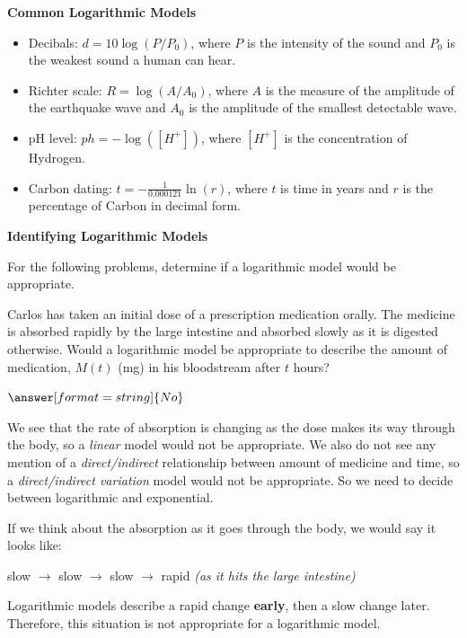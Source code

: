 \documentclass{ximera}
\begin{document}
\begin{center} \textbf{\Large Common Logarithmic Models} \end{center}

\begin{itemize}
	\item Decibals: $d = 10 \log(P/P_0)$, where $P$ is the intensity of the sound and $P_0$ is the weakest sound a human can hear.
	\item Richter scale: $R = \log(A/A_0)$, where $A$ is the measure of the amplitude of the earthquake wave and $A_0$ is the amplitude of the smallest detectable wave.
	\item pH level: $ph = -\log([H^+])$, where $[H^+]$ is the concentration of Hydrogen.
	\item Carbon dating: $t = -\frac{1}{0.000121} \ln(r)$, where $t$ is time in years and $r$ is the percentage of Carbon in decimal form.
\end{itemize}

\begin{center} \textbf{\Large Identifying Logarithmic Models} \end{center}

For the following problems, determine if a logarithmic model would be appropriate. 


\begin{question}
Carlos has taken an initial dose of a prescription medication orally. The medicine is absorbed rapidly by the large intestine and absorbed slowly as it is digested otherwise. Would a logarithmic model be appropriate to describe the amount of medication, $M(t)$ (mg) in his bloodstream after $t$ hours?

$\answer[format=string]{No}$

\begin{feedback}
We see that the rate of absorption is changing as the dose makes its way through the body, so a \textit{linear} model would not be appropriate. We also do not see any mention of a \textit{direct/indirect} relationship between amount of medicine and time, so a \textit{direct/indirect variation} model would not be appropriate. So we need to decide between logarithmic and exponential. 

If we think about the absorption as it goes through the body, we would say it looks like:

slow $\rightarrow$ slow $\rightarrow$ slow $\rightarrow$ rapid \textit{(as it hits the large intestine)}

Logarithmic models describe a rapid change \textbf{early}, then a slow change later. Therefore, this situation is not appropriate for a logarithmic model.
\end{feedback}

\end{question}
\end{document}
